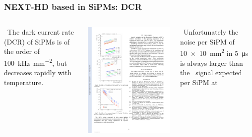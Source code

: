 \begin{frame}
\frametitle{NEXT-HD based in SiPMs:  DCR}

\begin{columns}

\blt\ The dark current rate (DCR) of SiPMs is of the order of \SI{100}{\kilo\hertz\per\mm^2}, but decreases rapidly with temperature. 

\includegraphics[scale=0.63]{img/dcR_T.pdf}

 
 \blt\ Unfortunately the noise per SiPM of \SI{10 x 10}{mm^2} in \SI{5}{\micro\second} is always larger than the \sone\ signal expected per SiPM at \Qbb


\end{columns}
\end{frame}
